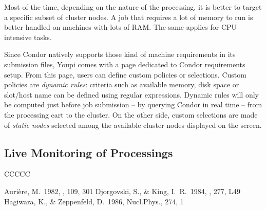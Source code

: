 \documentclass[11pt,twoside]{article}  %
\begin{document}
Most of the time, depending on the nature of the processing, it is better to target a 
specific subset of cluster nodes. A job that requires a lot of memory to run is better 
handled on machines with lots of RAM. The same applies for CPU intensive tasks.

Since Condor natively supports those kind of machine requirements in its submission files,
Youpi comes with a page dedicated to Condor requirements setup. From this page, users can 
define custom policies or selections. Custom policies are \emph{dynamic rules}: criteria
such as available memory, disk space or slot/host name can be defined using regular expressions.
Dynamic rules will only be computed just before job submission -- by querying Condor in real 
time -- from the processing cart to the cluster. On the other side, custom selections are 
made of \emph{static nodes} selected among the available cluster nodes displayed on the screen.

\subsection{Live Monitoring of Processings}
CCCCC

%
%
%

\begin{references}

 Auri\`ere, M.\  1982, \aap, 109, 301
 Djorgovski, S., \& King, I.\ R.\  1984, \apj, 277, L49
 Hagiwara, K., \& Zeppenfeld, D.\  1986, Nucl.Phys., 274, 1
    
\end{references}

\end{document}
